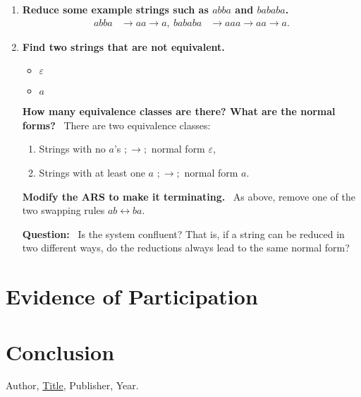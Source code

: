 \documentclass{article}
\theoremstyle{theorem}
\theoremstyle{definition}
\theoremstyle{remark}
\begin{document}
\begin{enumerate}
  \item \textbf{Reduce some example strings such as $abba$ and $bababa$.}
  \begin{align}
    abba &\to aa \to a, \
    bababa &\to aaa \to aa \to a.
  \end{align}

  \item \textbf{Find two strings that are not equivalent.}
  \begin{itemize}
    \item $\varepsilon$
    \item $a$
  \end{itemize}

   \textbf{How many equivalence classes are there? What are the normal forms?} \
  There are two equivalence classes:
  \begin{enumerate}
    \item Strings with no $a$’s $;\to;$ normal form $\varepsilon$,
    \item Strings with at least one $a$ $;\to;$ normal form $a$.
  \end{enumerate}

 \textbf{Modify the ARS to make it terminating.} \
  As above, remove one of the two swapping rules $ab \leftrightarrow ba$.

   \textbf{Question:} \
  Is the system confluent? That is, if a string can be reduced in two different ways, do the reductions always lead to the same normal form?

\end{enumerate}


\section{Evidence of Participation}

\section{Conclusion}\label{conclusion}

\begin{thebibliography}{99}
 Author, \href{https://en.wikipedia.org/wiki/LaTeX}{Title}, Publisher, Year.
\end{thebibliography}
\end{document}
